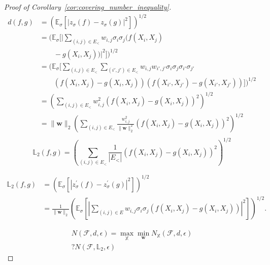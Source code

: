 \documentclass[letterpaper]{article} %
\def\DoubleColumnEnd{}
\def\SingleColumn{}
\def\SingleColumnEnd{}
\newcommand{\E}{\mathbb{E}}
\newcommand{\weight}{\mathbf{w}}
\newcommand{\rademacher}{\sigma}
\newcommand{\pair}[1]{(#1)}
\newcommand{\lnorm}{\mathbb{L}}
\begin{document}
\begin{proof}[Proof of Corollary~\ref{cor:covering_number_inequality}]
\begin{align*}
    d(f,g)&=(\E_\rademacher[|z_\rademacher(f)-z_\rademacher(g)|^2])^{1/2}\\
    &=(\E_\rademacher[|\sum_{\pair{i,j}\in E_<}w_{i,j}\rademacher_i\rademacher_j(f(X_i,X_j)\\
    &\qquad-g(X_i,X_j))|^2])^{1/2}\\
    &=(\E_\rademacher[\sum_{\pair{i,j}\in E_<}\sum_{\pair{i',j'}\in E_<}w_{i,j}w_{i',j'}\rademacher_i\rademacher_j\rademacher_{i'}\rademacher_{j'}\\
    &\qquad (f(X_i,X_j)-g(X_i,X_j))(f(X_{i'},X_{j'})-g(X_{i'},X_{j'}))])^{1/2}\\
    &=(\sum_{\pair{i,j}\in E_<}w_{i,j}^2(f(X_i,X_j)-g(X_i,X_j))^2)^{1/2}\\
    &=\|\weight\|_2(\sum_{\pair{i,j}\in E_<}\frac{w_{i,j}^2}{\|\weight{}\|_2^2}(f(X_i,X_j)-g(X_i,X_j))^2)^{1/2}\\
\end{align*}
\[\lnorm_2(f,g)= (\sum_{\pair{i,j}\in E_<}\frac{1}{|E_<|}(f(X_i,X_j)-g(X_i,X_j))^2)^{1/2}\]
\DoubleColumnEnd
\SingleColumn
\begin{align*}
    \lnorm{}_2(f,g)&=(\E_\rademacher[|z^\prime_\rademacher(f)-z^\prime_\rademacher(g)|^2])^{1/2}\\
    &=\frac{1}{\|\weight{}\|_2}(\E_\rademacher[|\sum_{\pair{i,j}\in E}w_{i,j}\rademacher_i\rademacher_j(f(X_i,X_j)-g(X_i,X_j))|^2])^{1/2}.
\end{align*}
\SingleColumnEnd

\begin{align*}
    N(\mathcal{F}, d, \epsilon) = \max_{\mathbb{X}}\min_{\weight} N_{\mathbb{X}}(\mathcal{F}, d, \epsilon)\\
    ? N(\mathcal{F}, \lnorm_2, \epsilon)
\end{align*}


\end{proof}
\end{document}
